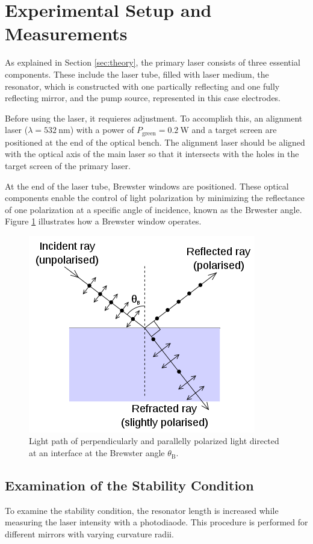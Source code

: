 \section{Experimental Setup and Measurements}

As explained in Section \ref{sec:theory}, the primary laser 
consists of three essential components. These 
include the laser tube, filled with laser medium, the resonator, 
which is constructed with one partically reflecting and one 
fully reflecting mirror, and the pump source, represented in this 
case electrodes. 

Before using the laser, it requieres adjustment. To accomplish this, 
an alignment laser ($\lambda=\SI{532}{\nano\meter}$) with a power 
of $P_\text{green}=\SI{0.2}{\watt}$ and a target screen are positioned
at the end of the optical bench. The alignment laser should be aligned 
with the optical axis of the main laser so that it intersects with 
the holes in the target screen of the primary laser.  

At the end of the laser tube, Brewster windows are positioned. 
These optical components enable the control of light polarization
by minimizing the reflectance of one polarization at a specific
angle of incidence, known as the Brwester angle. Figure \ref{fig:brewster} 
illustrates how a Brewster window operates.

\begin{figure}
    \centering
    \includegraphics[width=0.5\linewidth]{pictures/Brewster.png} %
    \caption{Light path of perpendicularly and parallelly polarized light directed at an interface at the Brewster angle $\theta_\text{B}$. \cite{Brewster}}
    \label{fig:brewster}
\end{figure}

\subsection{Examination of the Stability Condition}
To examine the stability condition, the resonator length is increased
while measuring the laser intensity with a photodiaode. This 
procedure is performed for different mirrors with varying curvature 
radii.

